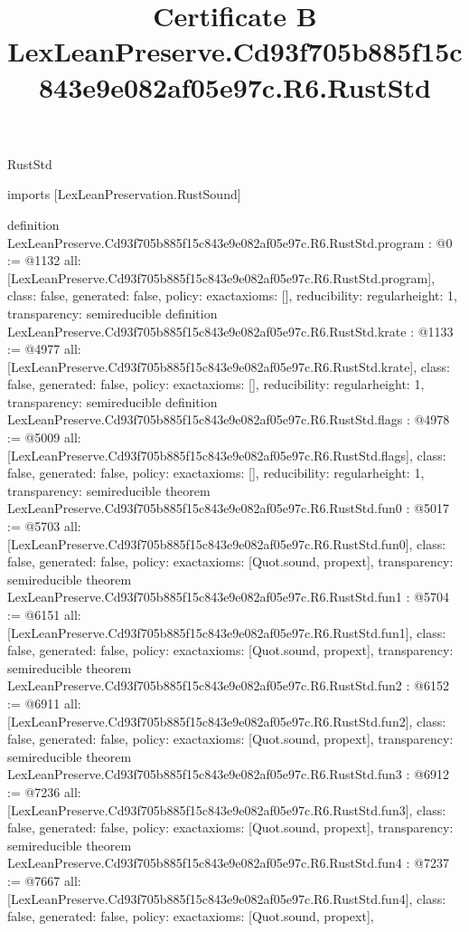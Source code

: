 \begin{lexlean}{RustStd}
\title{Certificate B LexLeanPreserve.Cd93f705b885f15c843e9e082af05e97c.R6.RustStd}
\begin{coremodule}
imports [LexLeanPreservation.RustSound]

definition LexLeanPreserve.Cd93f705b885f15c843e9e082af05e97c.R6.RustStd.program : @0 := @1132 {
  all: [LexLeanPreserve.Cd93f705b885f15c843e9e082af05e97c.R6.RustStd.program],
  class: false,
  generated: false,
  policy: exact{axioms: []},
  reducibility: regular{height: 1},
  transparency: semireducible
}
definition LexLeanPreserve.Cd93f705b885f15c843e9e082af05e97c.R6.RustStd.krate : @1133 := @4977 {
  all: [LexLeanPreserve.Cd93f705b885f15c843e9e082af05e97c.R6.RustStd.krate],
  class: false,
  generated: false,
  policy: exact{axioms: []},
  reducibility: regular{height: 1},
  transparency: semireducible
}
definition LexLeanPreserve.Cd93f705b885f15c843e9e082af05e97c.R6.RustStd.flags : @4978 := @5009 {
  all: [LexLeanPreserve.Cd93f705b885f15c843e9e082af05e97c.R6.RustStd.flags],
  class: false,
  generated: false,
  policy: exact{axioms: []},
  reducibility: regular{height: 1},
  transparency: semireducible
}
theorem LexLeanPreserve.Cd93f705b885f15c843e9e082af05e97c.R6.RustStd.fun0 : @5017 := @5703 {
  all: [LexLeanPreserve.Cd93f705b885f15c843e9e082af05e97c.R6.RustStd.fun0],
  class: false,
  generated: false,
  policy: exact{axioms: [Quot.sound, propext]},
  transparency: semireducible
}
theorem LexLeanPreserve.Cd93f705b885f15c843e9e082af05e97c.R6.RustStd.fun1 : @5704 := @6151 {
  all: [LexLeanPreserve.Cd93f705b885f15c843e9e082af05e97c.R6.RustStd.fun1],
  class: false,
  generated: false,
  policy: exact{axioms: [Quot.sound, propext]},
  transparency: semireducible
}
theorem LexLeanPreserve.Cd93f705b885f15c843e9e082af05e97c.R6.RustStd.fun2 : @6152 := @6911 {
  all: [LexLeanPreserve.Cd93f705b885f15c843e9e082af05e97c.R6.RustStd.fun2],
  class: false,
  generated: false,
  policy: exact{axioms: [Quot.sound, propext]},
  transparency: semireducible
}
theorem LexLeanPreserve.Cd93f705b885f15c843e9e082af05e97c.R6.RustStd.fun3 : @6912 := @7236 {
  all: [LexLeanPreserve.Cd93f705b885f15c843e9e082af05e97c.R6.RustStd.fun3],
  class: false,
  generated: false,
  policy: exact{axioms: [Quot.sound, propext]},
  transparency: semireducible
}
theorem LexLeanPreserve.Cd93f705b885f15c843e9e082af05e97c.R6.RustStd.fun4 : @7237 := @7667 {
  all: [LexLeanPreserve.Cd93f705b885f15c843e9e082af05e97c.R6.RustStd.fun4],
  class: false,
  generated: false,
  policy: exact{axioms: [Quot.sound, propext]},
}
\end{coremodule}
\end{lexlean}
